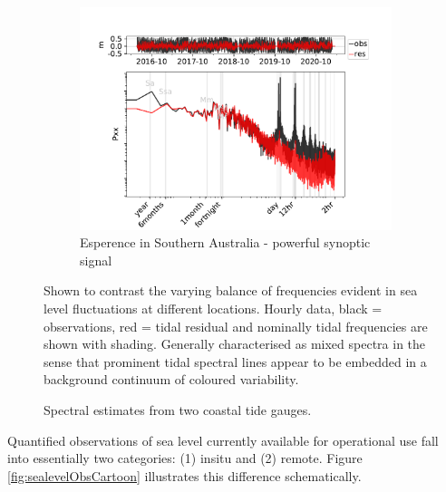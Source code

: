 \begin{figure}[!hbt]
    \begin{subfigure}[b]{\figwidthFull}
        \includegraphics[trim={0 0 0 35mm},clip,width=\textwidth]{figures/plots/109504_verify_Pxx.pdf}
        \caption{Esperence in Southern Australia - powerful synoptic signal}
    \end{subfigure}
    \caption{Spectral estimates from two coastal tide gauges.}{Shown to contrast the varying balance of frequencies evident in sea level fluctuations at different locations. Hourly data, black = observations, red = tidal residual and nominally tidal frequencies are shown with shading. Generally characterised as mixed spectra \citep{Percival:1998tw} in the sense that prominent tidal spectral lines appear to be embedded in a background continuum of coloured variability.}
    \label{fig:obsSpectraEg}
\end{figure}   

Quantified observations of sea level currently available for operational use fall into essentially two categories: (1) insitu and (2) remote.    Figure \ref{fig:sealevelObsCartoon} illustrates this difference schematically.

